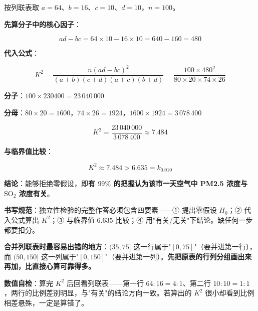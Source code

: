 \begin{answer}
按列联表取 $a=64$、$b=16$、$c=10$、$d=10$，$n=100$。

\textbf{先算分子中的核心因子}：

\nopagebreak[4]
\[ad-bc=64\times10-16\times10=640-160=480\]

\textbf{代入公式}：

\nopagebreak[4]
\[K^{2}=\frac{n(ad-bc)^{2}}{(a+b)(c+d)(a+c)(b+d)}=\frac{100\times480^{2}}{80\times20\times74\times26}\]

\textbf{分子}：$100\times230400=23\,040\,000$

\textbf{分母}：$80\times20=1600$，$74\times26=1924$，$1600\times1924=3\,078\,400$

\nopagebreak[4]
\[K^{2}=\frac{23\,040\,000}{3\,078\,400}\approx7.484\]

\textbf{与临界值比较}：

\nopagebreak[4]
\[K^{2}\approx7.484>6.635=k_{0.010}\]

\textbf{结论}：能够拒绝零假设，即\textbf{有 $99\%$ 的把握认为该市一天空气中 PM2.5 浓度与 $\mathrm{SO_2}$ 浓度有关}。

\begin{gktip}
\textbf{书写规范}：独立性检验的完整作答必须包含四要素——① 提出零假设 $H_0$；② 代入公式算出 $K^{2}$；③ 与临界值 $6.635$ 比较；④ 用"有关/无关"下结论。缺任何一步都要扣分。

\textbf{合并列联表时最容易出错的地方}：$(35,75]$ 这一行属于"$[0,75]$"（要并进第一行），而 $(50,150]$ 这一列属于"$[0,150]$"（要并进第一列）。\textbf{先把原表的行列分组画出来再加，比直接心算可靠得多。}

\textbf{数值自检}：算完 $K^{2}$ 后回看列联表——第一行 $64:16=4:1$、第二行 $10:10=1:1$，两行的比例差别明显，与"有关"的结论方向一致。若算出的 $K^{2}$ 很小却看到比例相差悬殊，一定是算错了。
\end{gktip}




\par\medskip

\end{answer}
